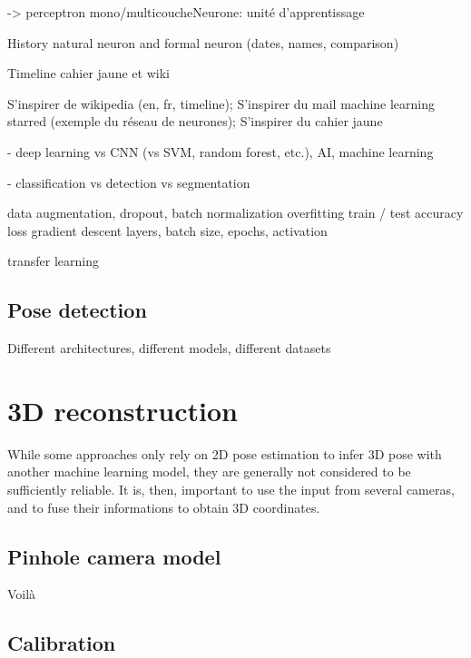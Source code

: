 -> perceptron mono/multicoucheNeurone: unité d'apprentissage



History natural neuron and formal neuron (dates, names, comparison)

Timeline cahier jaune et wiki

S'inspirer de wikipedia (en, fr, timeline); 
S'inspirer du mail machine learning starred (exemple du réseau de neurones); 
S'inspirer du cahier jaune


- deep learning vs CNN (vs SVM, random forest, etc.), AI, machine learning

- classification vs detection vs segmentation

data augmentation, dropout, batch normalization
overfitting
train / test
accuracy loss
gradient descent
layers, batch size, epochs, activation

transfer learning



\subsection{Pose detection}

Different architectures, different models, different datasets


\section{3D reconstruction}\label{sec:3D reconstruction}

While some approaches only rely on 2D pose estimation to infer 3D pose with another machine learning model, they are generally not considered to be sufficiently reliable. It is, then, important to use the input from several cameras, and to fuse their informations to obtain 3D coordinates.


\subsection{Pinhole camera model}

Voilà


\subsection{Calibration}

